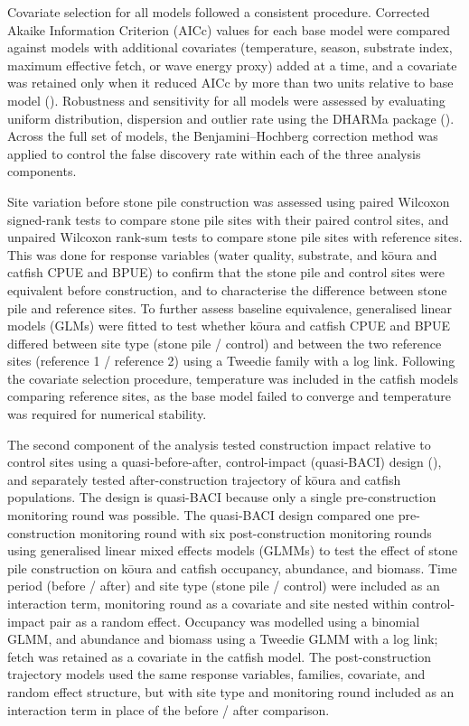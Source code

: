 \documentclass[
  letterpaper,
  DIV=11,
  numbers=noendperiod]{scrartcl}
\begin{document}
Covariate selection for all models followed a consistent procedure.
Corrected Akaike Information Criterion (AICc) values for each base model
were compared against models with additional covariates (temperature,
season, substrate index, maximum effective fetch, or wave energy proxy)
added at a time, and a covariate was retained only when it reduced AICc
by more than two units relative to base model
(). Robustness and
sensitivity for all models were assessed by evaluating uniform
distribution, dispersion and outlier rate using the DHARMa package
(). Across the full set of models,
the Benjamini--Hochberg correction method was applied to control the
false discovery rate within each of the three analysis components.

Site variation before stone pile construction was assessed using paired
Wilcoxon signed-rank tests to compare stone pile sites with their paired
control sites, and unpaired Wilcoxon rank-sum tests to compare stone
pile sites with reference sites. This was done for response variables
(water quality, substrate, and kōura and catfish CPUE and BPUE) to
confirm that the stone pile and control sites were equivalent before
construction, and to characterise the difference between stone pile and
reference sites. To further assess baseline equivalence, generalised
linear models (GLMs) were fitted to test whether kōura and catfish CPUE
and BPUE differed between site type (stone pile / control) and between
the two reference sites (reference 1 / reference 2) using a Tweedie
family with a log link. Following the covariate selection procedure,
temperature was included in the catfish models comparing reference
sites, as the base model failed to converge and temperature was required
for numerical stability.

The second component of the analysis tested construction impact relative
to control sites using a quasi-before-after, control-impact (quasi-BACI)
design (), and separately
tested after-construction trajectory of kōura and catfish populations.
The design is quasi-BACI because only a single pre-construction
monitoring round was possible. The quasi-BACI design compared one
pre-construction monitoring round with six post-construction monitoring
rounds using generalised linear mixed effects models (GLMMs) to test the
effect of stone pile construction on kōura and catfish occupancy,
abundance, and biomass. Time period (before / after) and site type
(stone pile / control) were included as an interaction term, monitoring
round as a covariate and site nested within control-impact pair as a
random effect. Occupancy was modelled using a binomial GLMM, and
abundance and biomass using a Tweedie GLMM with a log link; fetch was
retained as a covariate in the catfish model. The post-construction
trajectory models used the same response variables, families, covariate,
and random effect structure, but with site type and monitoring round
included as an interaction term in place of the before / after
comparison.
\end{document}
